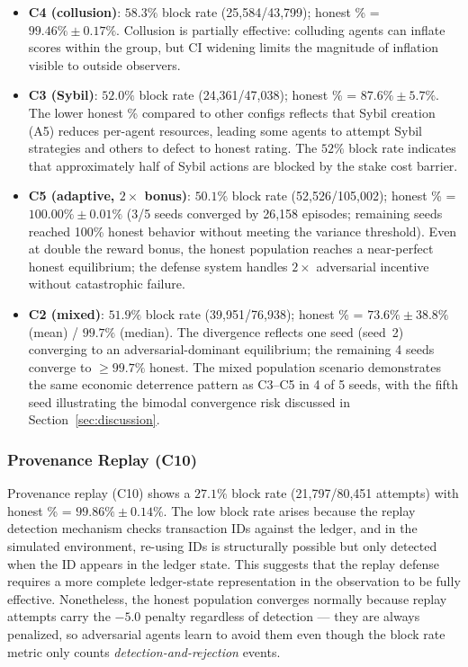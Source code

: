 \begin{itemize}[noitemsep]
  \item \textbf{C4 (collusion)}: $58.3\%$ block rate (25{,}584/43{,}799);
        honest \% = $99.46\% \pm 0.17\%$.  Collusion is partially effective:
        colluding agents can inflate scores within the group, but CI widening
        limits the magnitude of inflation visible to outside observers.
  \item \textbf{C3 (Sybil)}: $52.0\%$ block rate (24{,}361/47{,}038);
        honest \% = $87.6\% \pm 5.7\%$.  The lower honest \% compared to
        other configs reflects that Sybil creation (A5) reduces per-agent
        resources, leading some agents to attempt Sybil strategies and others
        to defect to honest rating.  The $52\%$ block rate indicates that
        approximately half of Sybil actions are blocked by the stake
        cost barrier.
  \item \textbf{C5 (adaptive, $2\times$ bonus)}: $50.1\%$ block rate
        (52{,}526/105{,}002); honest \% = $100.00\% \pm 0.01\%$ (3/5 seeds
        converged by 26{,}158 episodes; remaining seeds reached 100\% honest
        behavior without meeting the variance threshold).  Even at double
        the reward bonus, the honest population reaches a near-perfect honest
        equilibrium; the defense system handles $2\times$ adversarial incentive
        without catastrophic failure.
  \item \textbf{C2 (mixed)}: $51.9\%$ block rate (39{,}951/76{,}938);
        honest \% = $73.6\% \pm 38.8\%$ (mean) / $99.7\%$ (median).
        The divergence reflects one seed (seed~2) converging to an
        adversarial-dominant equilibrium; the remaining 4 seeds converge
        to $\geq\!99.7\%$ honest.  The mixed population scenario demonstrates
        the same economic deterrence pattern as C3--C5 in 4 of 5 seeds,
        with the fifth seed illustrating the bimodal convergence risk
        discussed in Section~\ref{sec:discussion}.
\end{itemize}

\subsubsection{Provenance Replay (C10)}

Provenance replay (C10) shows a $27.1\%$ block rate (21{,}797/80{,}451 attempts)
with honest \% = $99.86\% \pm 0.14\%$.  The low block rate arises because
the replay detection mechanism checks transaction IDs against the ledger, and
in the simulated environment, re-using IDs is structurally possible but only
detected when the ID appears in the ledger state.  This suggests that the
replay defense requires a more complete ledger-state representation in the
observation to be fully effective.  Nonetheless, the honest population
converges normally because replay attempts carry the $-5.0$ penalty regardless
of detection — they are always penalized, so adversarial agents learn to
avoid them even though the block rate metric only counts
\emph{detection-and-rejection} events.

